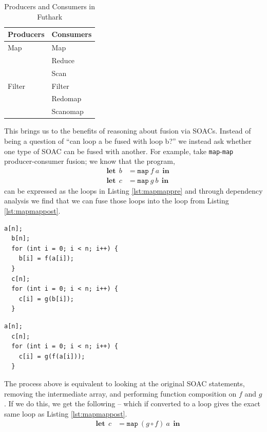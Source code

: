 \documentclass[11pt,bibliography=totocnumbered]{article}
\newcommand\lett{\phantom{-}\:\:\mathbf{let}\:\:}
\newcommand\inn{\:\:\mathbf{in}\:\:}
\begin{document}
\begin{table}[hb!]
\centering
\caption{Producers and Consumers in Futhark}
\label{my-label}
\begin{tabular}{|l|l|}
\hline
\textbf{Producers} & \textbf{Consumers} \\ \hline
Map                & Map                \\ \hline
                   & Reduce             \\ \hline
                   & Scan               \\ \hline
Filter             & Filter             \\ \hline
                   & Redomap            \\ \hline
                   & Scanomap           \\ \hline
\end{tabular}
\end{table}

This brings us to the benefits of reasoning about fusion via SOACs. Instead of being a question of ``can loop a be fused with loop b?'' we instead ask whether one type of SOAC can
 be fused with another. For example, take \texttt{map}-\texttt{map} producer-consumer fusion; we know that the program,
 \begin{align*}
   \lett b &= \mathtt{map} \: f \: a \inn \\
   \lett c &= \mathtt{map} \: g \: b \inn
 \end{align*}
can be expressed as the loops in Listing \ref{lst:mapmappre}
 and through dependency analysis we find that we can fuse those loops into the loop from Listing \ref{lst:mapmappost}.
\begin{lstlisting}[caption=\texttt{map} and \texttt{map} as producer and consumer, label={lst:mapmappre}]
  a[n];  	  
  b[n];
  for (int i = 0; i < n; i++) {
    b[i] = f(a[i]);
  }
  c[n];
  for (int i = 0; i < n; i++) {
    c[i] = g(b[i]);
  }
\end{lstlisting}
\begin{lstlisting}[caption=Loop from Listing \ref{lst:mapmappre} fused as producer and consumer, label={lst:mapmappost}]
  a[n];  	  
  c[n];
  for (int i = 0; i < n; i++) {
    c[i] = g(f(a[i]));
  }
\end{lstlisting}
The process above is equivalent to looking at the original SOAC statements, removing the intermediate array, and performing function composition on $f$ and $g$. If
 we do this, we get the following -- which if converted to a loop gives the exact same loop as Listing \ref{lst:mapmappost}.
 \begin{align*}
   \lett c &= \mathtt{map} \: (g \circ f) \: a \inn
 \end{align*}
\end{document}
